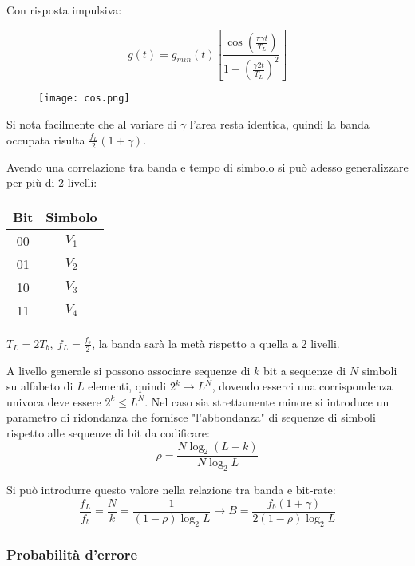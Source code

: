 \documentclass{article}
\begin{document}
\noindent Con risposta impulsiva:

$$ g(t)=g_{min}(t)\left[\frac{\displaystyle\cos(\frac{\pi\gamma t}{T_L})}{1-(\frac{\displaystyle\gamma2t}{T_L})^2}\right]$$

\begin{figure}[ht]
    \centering
    \texttt{[image: cos.png]}
\end{figure}

\newpage

\noindent Si nota facilmente che al variare di $\gamma$ l'area resta identica, quindi la banda occupata risulta $\frac{f_L}{2}(1+\gamma)$.\newline

\noindent Avendo una correlazione tra banda e tempo di simbolo si può adesso generalizzare per più di 2 livelli:

\begin{table}[ht]
    \centering
    \begin{tabular}{c|c}
        Bit & Simbolo\\
         \hline
        00 & $V_1$\\
        01 & $V_2$\\
        10 & $V_3$\\
        11 & $V_4$\\
    \end{tabular}
\end{table}

\noindent $T_L=2T_b,\ f_L=\frac{f_b}{2}$, la banda sarà la metà rispetto a quella a 2 livelli.\newline

\noindent A livello generale si possono associare sequenze di $k$ bit a sequenze di $N$ simboli su alfabeto di $L$ elementi, quindi $2^k\rightarrow L^N$, dovendo esserci una corrispondenza univoca deve essere $2^k\leq L^N$. Nel caso sia strettamente minore si introduce un parametro di ridondanza che fornisce "l'abbondanza" di sequenze di simboli rispetto alle sequenze di bit da codificare:
$$\rho=\frac{N\log_2(L-k)}{N\log_2L}$$\newline

\noindent Si può introdurre questo valore nella relazione tra banda e bit-rate:
$$\frac{f_L}{f_b}=\frac{N}{k}=\frac{1}{(1-\rho)\log_2L}\rightarrow B=\frac{f_b(1+\gamma)}{2(1-\rho)\log_2L}$$

\newpage

\subsubsection{Probabilità d'errore}
\end{document}
